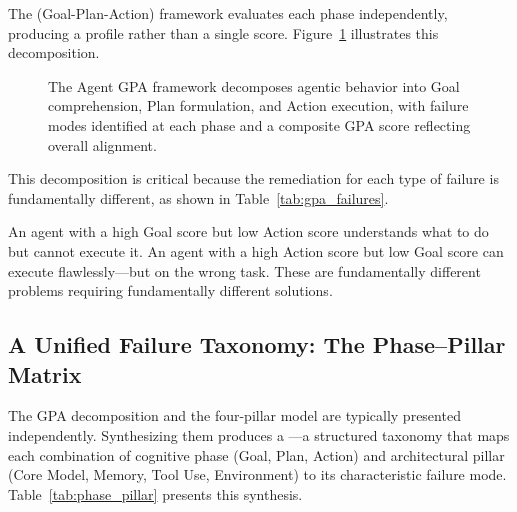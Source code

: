 The  (Goal-Plan-Action) framework evaluates each phase independently, producing a profile rather than a single score. Figure~\ref{fig:agent_gpa} illustrates this decomposition.

\begin{figure}[htbp]
\centering

\caption{The Agent GPA framework decomposes agentic behavior into Goal comprehension, Plan formulation, and Action execution, with failure modes identified at each phase and a composite GPA score reflecting overall alignment.}
\label{fig:agent_gpa}
\end{figure}

This decomposition is critical because the remediation for each type of failure is fundamentally different, as shown in Table~\ref{tab:gpa_failures}.

\begin{table}[htbp]
\centering
\caption{GPA failure phases, symptoms, root causes, and remediations.}
\label{tab:gpa_failures}
\end{table}

An agent with a high Goal score but low Action score understands what to do but cannot execute it. An agent with a high Action score but low Goal score can execute flawlessly---but on the wrong task. These are fundamentally different problems requiring fundamentally different solutions.

\subsection{A Unified Failure Taxonomy: The Phase--Pillar Matrix}

The GPA decomposition and the four-pillar model are typically presented independently. Synthesizing them produces a ---a structured taxonomy that maps each combination of cognitive phase (Goal, Plan, Action) and architectural pillar (Core Model, Memory, Tool Use, Environment) to its characteristic failure mode. Table~\ref{tab:phase_pillar} presents this synthesis.

